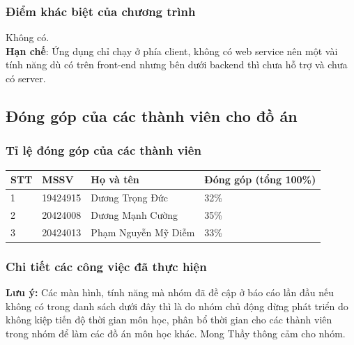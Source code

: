 \documentclass[12pt]{article}
\begin{document}
\subsubsection{Điểm khác biệt của chương trình}
Không có.\\
\indent \textbf{Hạn chế}: Ứng dụng chỉ chạy ở phía client, không có web service nên một vài tính năng dù có trên front-end nhưng bên dưới backend thì chưa hỗ trợ và chưa có server.

\subsection{Đóng góp của các thành viên cho đồ án}
\subsubsection{Tỉ lệ đóng góp của các thành viên}
\begin{tabular}{ |p{1cm}||p{3cm}|p{6cm}|p{5cm}|  }
    \hline
    \textbf{STT} & \textbf{MSSV} & \textbf{Họ và tên}  & \textbf{Đóng góp} (tổng 100\%) \\
    \hline \hline
    1            & 19424915      & Dương Trọng Đức     & 32\%                           \\ \hline
    2            & 20424008      & Dương Mạnh Cường    & 35\%                           \\ \hline
    3            & 20424013      & Phạm Nguyễn Mỹ Diễm & 33\%                           \\
    \hline
\end{tabular}

\subsubsection{Chi tiết các công việc đã thực hiện}
\textbf{Lưu ý:} Các màn hình, tính năng mà nhóm đã đề cập ở báo cáo lần đầu nếu không có trong danh sách dưới đây thì là do nhóm chủ động dừng phát triển do không kiệp tiến độ thời gian môn học, phân bổ thời gian cho các thành viên trong nhóm để làm các đồ án môn học khác. Mong Thầy thông cảm cho nhóm.\\\\
\end{document}
